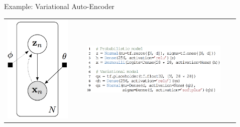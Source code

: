 \documentclass[final]{beamer}
\begin{document}
\begin{frame}[t]
\begin{columns}[t]
\begin{column}{\onecolwid}
\end{column}

\begin{column}{\sepwid}\end{column} %

\begin{column}{\onecolwid}

\begin{block}{Example: Variational Auto-Encoder}
\begin{tabular}{cc}
\hspace{-2.15em}
\includegraphics{img/vae_graph.png}
&
\hspace{-0.5em}
\includegraphics[width=0.85\textwidth]{img/vae_code.png}
\end{tabular}
\vspace{-2ex}
\end{block}


\end{column}
\end{columns}
\end{frame}
\end{document}
